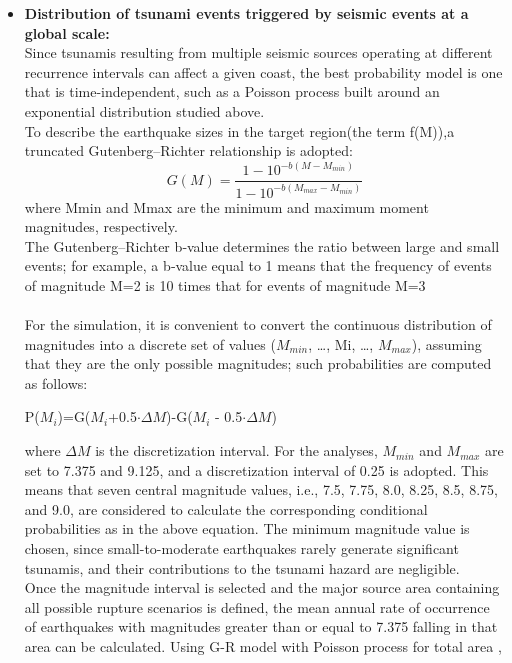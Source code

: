 \documentclass{article}
\begin{document}
\begin{itemize}
 \begin{itemize}
    \item \textbf{Distribution of tsunami events triggered by seismic events at a global scale:}\\
     Since tsunamis resulting from multiple seismic sources operating at different recurrence intervals can affect a given coast, the best probability model is one that is time-independent, such as a Poisson process built around an exponential distribution studied above.\\
      To describe the earthquake sizes in the target region(the term f(M)),a truncated Gutenberg–Richter relationship\cite{cite8} is adopted: \\
    $$G(M)=\frac{1-10^{-b(M-M_{min})}}{1-10^{-b(M_{max}-M_{min})}}$$ \cite{cite2}
    where Mmin and Mmax are the minimum and maximum moment magnitudes, respectively.\\
    The Gutenberg–Richter b‐value determines the ratio between large and small events; for example, a b‐value equal to 1 means that the frequency of events of magnitude M=2 is 10 times that for events of magnitude M=3\\
    \\
    For the simulation, it is convenient to convert the continuous distribution of magnitudes into a discrete set of values ($M_{min}$, …, Mi, …, $M_{max}$), assuming that they are the only possible magnitudes; such probabilities are computed as follows:\\
    \begin{center}
        P($M_{i}$)=G($M_{i}$+0.5$ \cdot \Delta M$)-G($M_{i}$ - 0.5$ \cdot \Delta M$)
    \end{center}
    
where $\Delta M$ is the discretization interval. 
For the analyses, $M_{min}$ and $M_{max}$ are set to 7.375 and 9.125, and a discretization interval of 0.25 is adopted. This means that seven central magnitude values, i.e., 7.5, 7.75, 8.0, 8.25, 8.5, 8.75, and 9.0, are considered to calculate the corresponding conditional probabilities as in the above equation. The minimum magnitude value is chosen, since small-to-moderate earthquakes rarely generate significant tsunamis, and their contributions to the tsunami hazard are negligible.\cite{cite5}\\  

Once the magnitude interval is selected and the major source area containing all possible rupture scenarios is defined, the mean annual rate of occurrence of earthquakes with magnitudes greater than or equal to 7.375 falling in that area can be calculated\cite{cite7}. Using G-R model with Poisson process for total area\cite{cite3} ,\\


\end{itemize}
\end{itemize}
\end{document}
